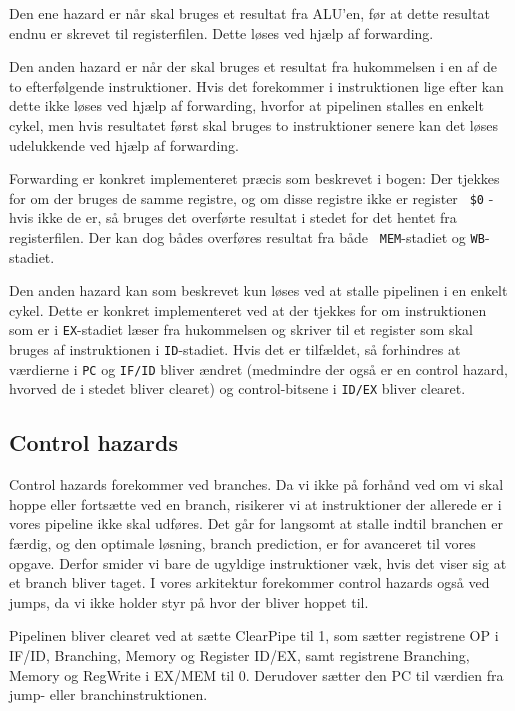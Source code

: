 Den ene hazard er når skal bruges et resultat fra ALU'en, før at dette resultat endnu er skrevet
til registerfilen. Dette løses ved hjælp af forwarding.

Den anden hazard er når der skal bruges et resultat fra hukommelsen i en af de
to efterfølgende instruktioner. Hvis det forekommer i instruktionen lige efter
kan dette ikke løses ved hjælp af forwarding, hvorfor at pipelinen stalles en
enkelt cykel, men hvis resultatet først skal bruges to instruktioner senere kan
det løses udelukkende ved hjælp af forwarding.

Forwarding er konkret implementeret præcis som beskrevet i bogen: Der tjekkes
for om der bruges de samme registre, og om disse registre ikke er register {\tt
\$0} - hvis ikke de er, så bruges det overførte resultat i stedet for det hentet
fra registerfilen. Der kan dog bådes overføres resultat fra både {\tt 
MEM}-stadiet og {\tt WB}-stadiet.

Den anden hazard kan som beskrevet kun løses ved at stalle pipelinen i en enkelt
cykel. Dette er konkret implementeret ved at der tjekkes for om instruktionen 
som er i {\tt EX}-stadiet læser fra hukommelsen og skriver til et register som 
skal bruges af instruktionen i {\tt ID}-stadiet. Hvis det er tilfældet, så 
forhindres at værdierne i {\tt PC} og {\tt IF/ID} bliver ændret (medmindre der 
også er en control hazard, hvorved de i stedet bliver clearet) og
control-bitsene i {\tt ID/EX} bliver clearet.

\subsection{Control hazards}
Control hazards forekommer ved branches. Da vi ikke på forhånd ved om vi skal hoppe
eller fortsætte ved en branch, risikerer vi at instruktioner der allerede er i vores
pipeline ikke skal udføres. Det går for langsomt at stalle indtil branchen er færdig,
og den optimale løsning, branch prediction, er for avanceret til vores opgave. Derfor
smider vi bare de ugyldige instruktioner væk, hvis det viser sig at et branch bliver taget.
I vores arkitektur forekommer control hazards også ved jumps, da vi ikke holder styr på hvor
der bliver hoppet til.

Pipelinen bliver clearet ved at sætte ClearPipe til 1, som sætter registrene OP i IF/ID, Branching, Memory og Register
ID/EX, samt registrene Branching, Memory og RegWrite i EX/MEM til 0. Derudover sætter den PC til værdien
fra jump- eller branchinstruktionen. 


